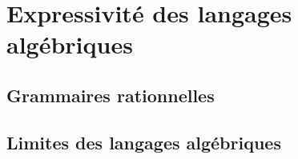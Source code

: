 \section{Expressivité des langages algébriques}
 
\subsection{Grammaires rationnelles}







 
\subsection{Limites des langages algébriques}




\endgroup
\endinput



% 
%
%
% 
%
%
%
%
%
%
% 
%
%
%
%
%
%
% 
%
%
% 
%
%


